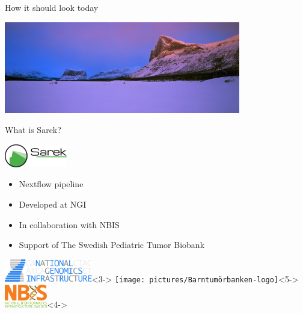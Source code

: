 \documentclass{beamer}
\begin{document}
\begin{frame}{How it should look today}
	\begin{center}
		\includegraphics[height=4cm]{pictures/Skierfe-winter.jpg}
	\end{center}
\end{frame}

\begin{frame}{What is Sarek?}
	\vfill
	\begin{center}
		\includegraphics[height=1cm]{pictures/Sarek_no_border}
	\end{center}
	\begin{itemize}
		\pause
		\item Nextflow pipeline
		\item<3-> Developed at NGI
		\item<4-> In collaboration with NBIS
		\item<5-> Support of The Swedish Pediatric Tumor Biobank
	\end{itemize}
	\begin{center}
		\includegraphics[height=1cm]{pictures/NGI}<3->
		\only<3->{\hfill}
		\texttt{[image: pictures/Barntumörbanken-logo]}<5->
		\only<4->{\hfill}
		\includegraphics[height=1cm]{pictures/NBIS}<4->
	\end{center}
	\vfill
\end{frame}
\end{document}

